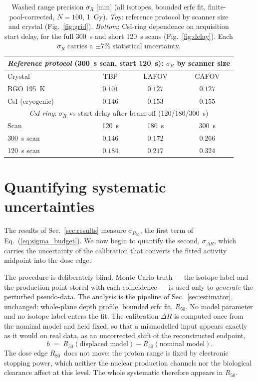 \documentclass[11pt]{article}
\newcommand{\Rc}{\ensuremath{R_{50}}}
\newcommand{\Roc}{\ensuremath{R_{80}}}
\newcommand{\DR}{\ensuremath{\Delta R}}
\begin{document}
\begin{table}[htbp!]
  \centering
  \begin{tabular}{lccc}
    \toprule
    \multicolumn{4}{c}{\emph{Reference protocol} (\SI{300}{s} scan, start \SI{120}{s}): $\sigma_R$ by scanner size} \\
    \midrule
    Crystal & TBP & LAFOV & CAFOV \\
    \midrule
    BGO 195~K       & $0.101$ & $0.127$ & $0.127$ \\
    CsI (cryogenic) & $0.146$ & $0.153$ & $0.155$ \\
    \midrule
    \multicolumn{4}{c}{\emph{CsI ring}: $\sigma_R$ vs start delay after beam-off (\SI{120}{}/\SI{180}{}/\SI{300}{s})} \\
    \midrule
    Scan & \SI{120}{s} & \SI{180}{s} & \SI{300}{s} \\
    \midrule
    \SI{300}{s} scan & $0.146$ & $0.172$ & $0.266$ \\
    \SI{120}{s} scan & $0.184$ & $0.217$ & $0.324$ \\
    \bottomrule
  \end{tabular}
  \caption{Washed range precision $\sigma_R$ [mm] (all isotopes, bounded erfc
    fit, finite-pool-corrected, $N=100$, \SI{1}{Gy}). \emph{Top}: reference
    protocol by scanner size and crystal (Fig.~\ref{fig:grid}). \emph{Bottom}:
    CsI-ring dependence on acquisition start delay, for the full \SI{300}{s} and
    short \SI{120}{s} scans (Fig.~\ref{fig:delay}). Each $\sigma_R$ carries a
    $\pm7\%$ statistical uncertainty.}
  \label{tab:sigmaR}
\end{table}



\FloatBarrier
\section{Quantifying systematic uncertainties}
\label{sec:systematics}

The results of Sec.~\ref{sec:results} measure $\sigma_{\Rc}$, the first term of
Eq.~(\ref{eq:sigma_budget}). We now begin to quantify the second, $\sigma_{\DR}$,
which carries the uncertainty of the calibration that converts the fitted
activity midpoint into the dose edge.

The procedure is deliberately blind. Monte Carlo truth --- the isotope label and
the production point stored with each coincidence --- is used only to
\emph{generate} the perturbed pseudo-data. The analysis is the pipeline of
Sec.~\ref{sec:estimator}, unchanged: whole-plane depth profile, bounded erfc fit,
\Rc. No model parameter and no isotope label enters the fit. The calibration
$\DR$ is computed once from the nominal model and held fixed, so that a
mismodelled input appears exactly as it would on real data, as an uncorrected
shift of the reconstructed endpoint,
%
\begin{equation}
  b \;=\; \Rc(\text{displaced model}) - \Rc(\text{nominal model}) .
  \label{eq:bias}
\end{equation}
%
The dose edge \Roc\ does not move: the proton range is fixed by electronic
stopping power, which neither the nuclear production channels nor the biological
clearance affect at this level. The whole systematic therefore appears in \Rc.
\end{document}

